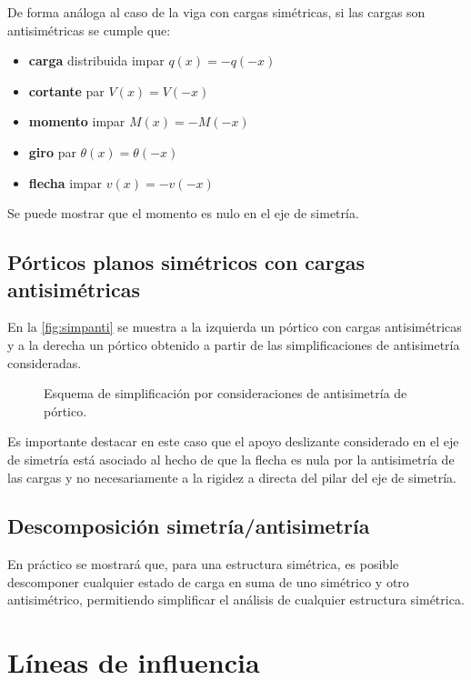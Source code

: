 De forma análoga al caso de la viga con cargas simétricas, si las cargas son antisimétricas se cumple que:
%
\begin{itemize}
\item \textbf{carga} distribuida impar $q(x) = -q(-x)$
\item \textbf{cortante} par $V(x) = V(-x)$
\item \textbf{momento} impar $M(x) = -M(-x)$
\item \textbf{giro} par $\theta(x) = \theta(-x)$
\item \textbf{flecha} impar $v(x) = -v(-x)$
\end{itemize}

Se puede mostrar que el momento es nulo en el eje de simetría.

\subsection{Pórticos planos simétricos con cargas antisimétricas}

%
En la \autoref{fig:simpanti} se muestra a la izquierda un pórtico con cargas antisimétricas y a la derecha un pórtico obtenido a partir de las simplificaciones de antisimetría consideradas.
%
\begin{figure}[htb]
	\centering
	\setlength{\unitlength}{0.8\textwidth}
\def\svgwidth{0.8\textwidth}

	\caption{Esquema de simplificación por consideraciones de antisimetría de pórtico.}
	\label{fig:simpanti}
\end{figure}

Es importante destacar en este caso que el apoyo deslizante considerado en el eje de simetría está asociado al hecho de que la flecha es nula por la antisimetría de las cargas y no necesariamente a la rigidez a directa del pilar del eje de simetría.

\subsection{Descomposición simetría/antisimetría}

En práctico se mostrará que, para una estructura simétrica, es posible descomponer cualquier estado de carga en suma de uno simétrico y otro antisimétrico, permitiendo simplificar el análisis de cualquier estructura simétrica.


\section{Líneas de influencia}

